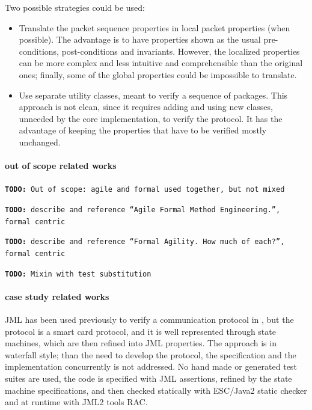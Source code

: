\documentclass[english]{lni}
\newcommand{\todo}[1]{\texttt{\textbf{TODO:} #1}}
\begin{document}
Two possible strategies could be used:
\begin{itemize}
\item Translate the packet sequence properties in local packet properties (when possible).  
The advantage is to have properties shown as the usual pre-conditions, post-conditions and invariants.  
However, the localized properties can be more complex and less intuitive and comprehensible than the original ones; finally, some of the global properties could be impossible to translate.
\item Use separate utility classes, meant to verify a sequence of packages.  
This approach is not clean, since it requires adding and using new classes, unneeded by the core implementation, to verify the protocol.  It has the advantage of keeping the properties that have to be verified mostly unchanged.
\end{itemize}

\paragraph*{out of scope related works}

\todo{Out of scope: agile and formal used together, but not mixed}

\todo{describe and reference ``Agile Formal Method Engineering.'', formal centric}

\todo{describe and reference ``Formal Agility. How much of each?'', formal centric}

\todo{Mixin with test substitution}

\paragraph*{case study related works}

JML has been used previously to verify a communication protocol in \cite{Hubbers2004}, but the protocol is a smart card protocol, and it
is well represented through state machines, which are then refined into JML properties.  
The approach is in waterfall style; than the need to develop the protocol, the specification and the implementation concurrently is not addressed.  
No hand made or generated test suites are used, the code is specified with JML assertions, refined by the state machine specifications, and then checked statically with ESC/Java2 static checker\cite{CokKiniry04} and at runtime with JML2 tools RAC\cite{BurdyEtal05-STTT}.
\end{document}
